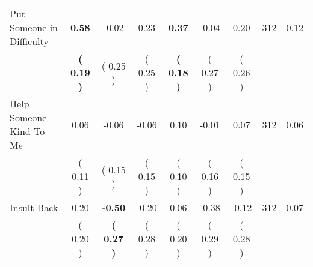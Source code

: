 \begin{tabular}{lcccccccc}
Put Someone in Difficulty & \textbf{     0.58} &     -0.02 &      0.23 & \textbf{     0.37} &     -0.04 &      0.20 & 312 &       0.12 \\ 
 & \textbf{(     0.19 )} & (     0.25 ) & (     0.25 ) & \textbf{(     0.18 )} & (     0.27 ) & (     0.26 ) & \\
Help Someone Kind To Me &      0.06 &     -0.06 &     -0.06 &      0.10 &     -0.01 &      0.07 & 312 &       0.06 \\ 
 & (     0.11 ) & (     0.15 ) & (     0.15 ) & (     0.10 ) & (     0.16 ) & (     0.15 ) & \\
Insult Back &      0.20 & \textbf{    -0.50} &     -0.20 &      0.06 &     -0.38 &     -0.12 & 312 &       0.07 \\ 
 & (     0.20 ) & \textbf{(     0.27 )} & (     0.28 ) & (     0.20 ) & (     0.29 ) & (     0.28 ) & \\
\bottomrule
\end{tabular}
